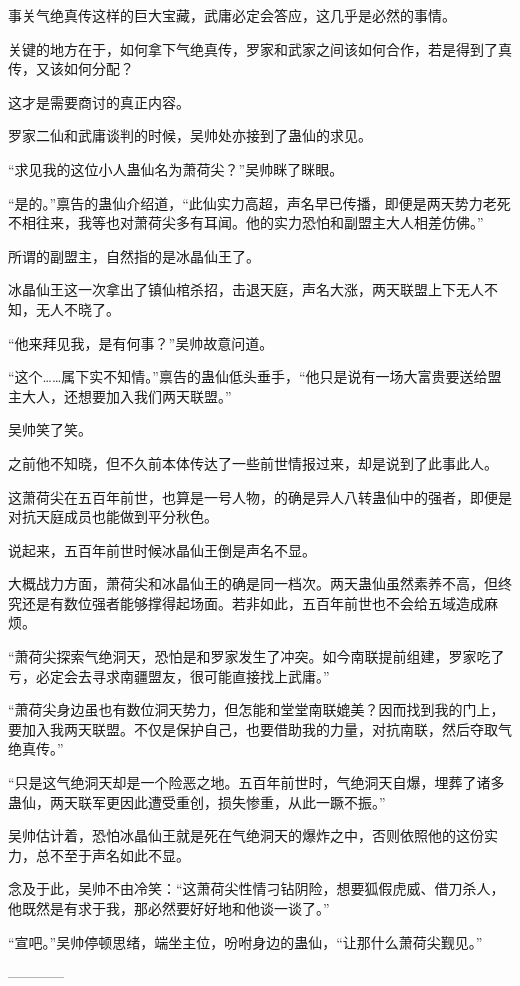 \begin{this_body}
事关气绝真传这样的巨大宝藏，武庸必定会答应，这几乎是必然的事情。

关键的地方在于，如何拿下气绝真传，罗家和武家之间该如何合作，若是得到了真传，又该如何分配？

这才是需要商讨的真正内容。

罗家二仙和武庸谈判的时候，吴帅处亦接到了蛊仙的求见。

“求见我的这位小人蛊仙名为萧荷尖？”吴帅眯了眯眼。

“是的。”禀告的蛊仙介绍道，“此仙实力高超，声名早已传播，即便是两天势力老死不相往来，我等也对萧荷尖多有耳闻。他的实力恐怕和副盟主大人相差仿佛。”

所谓的副盟主，自然指的是冰晶仙王了。

冰晶仙王这一次拿出了镇仙棺杀招，击退天庭，声名大涨，两天联盟上下无人不知，无人不晓了。

“他来拜见我，是有何事？”吴帅故意问道。

“这个……属下实不知情。”禀告的蛊仙低头垂手，“他只是说有一场大富贵要送给盟主大人，还想要加入我们两天联盟。”

吴帅笑了笑。

之前他不知晓，但不久前本体传达了一些前世情报过来，却是说到了此事此人。

这萧荷尖在五百年前世，也算是一号人物，的确是异人八转蛊仙中的强者，即便是对抗天庭成员也能做到平分秋色。

说起来，五百年前世时候冰晶仙王倒是声名不显。

大概战力方面，萧荷尖和冰晶仙王的确是同一档次。两天蛊仙虽然素养不高，但终究还是有数位强者能够撑得起场面。若非如此，五百年前世也不会给五域造成麻烦。

“萧荷尖探索气绝洞天，恐怕是和罗家发生了冲突。如今南联提前组建，罗家吃了亏，必定会去寻求南疆盟友，很可能直接找上武庸。”

“萧荷尖身边虽也有数位洞天势力，但怎能和堂堂南联媲美？因而找到我的门上，要加入我两天联盟。不仅是保护自己，也要借助我的力量，对抗南联，然后夺取气绝真传。”

“只是这气绝洞天却是一个险恶之地。五百年前世时，气绝洞天自爆，埋葬了诸多蛊仙，两天联军更因此遭受重创，损失惨重，从此一蹶不振。”

吴帅估计着，恐怕冰晶仙王就是死在气绝洞天的爆炸之中，否则依照他的这份实力，总不至于声名如此不显。

念及于此，吴帅不由冷笑：“这萧荷尖性情刁钻阴险，想要狐假虎威、借刀杀人，他既然是有求于我，那必然要好好地和他谈一谈了。”

“宣吧。”吴帅停顿思绪，端坐主位，吩咐身边的蛊仙，“让那什么萧荷尖觐见。”

------------

\end{this_body}

